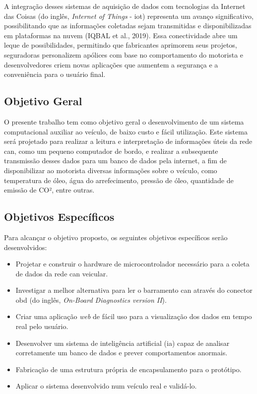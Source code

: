 \documentclass[a4paper, 12pt]{article}
\begin{document}
A integração desses sistemas de aquisição de dados com tecnologias da Internet das Coisas (do inglês, \textit{Internet of Things} - \acrshort{iot}) representa um avanço significativo, possibilitando que as informações coletadas sejam transmitidas e disponibilizadas em plataformas na nuvem (IQBAL et al., 2019). Essa conectividade abre um leque de possibilidades, permitindo que fabricantes aprimorem seus projetos, seguradoras personalizem apólices com base no comportamento do motorista e desenvolvedores criem novas aplicações que aumentem a segurança e a conveniência para o usuário final.

\subsection{Objetivo Geral}

O presente trabalho tem como objetivo geral o desenvolvimento de um sistema computacional auxiliar ao veículo, de baixo custo e fácil utilização. Este sistema será projetado para realizar a leitura e interpretação de informações úteis da rede \acrshort{can}, como um pequeno computador de bordo, e realizar a subsequente transmissão desses dados para um banco de dados pela internet, a fim de disponibilizar ao motorista diversas informações sobre o veículo, como temperatura de óleo, água do arrefecimento, pressão de óleo, quantidade de emissão de CO², entre outras.

\subsection{Objetivos Específicos}

Para alcançar o objetivo proposto, os seguintes objetivos específicos serão desenvolvidos:

\begin{itemize}

\item Projetar e construir o hardware de microcontrolador necessário para a coleta de dados da rede \acrshort{can} veicular.

\item Investigar a melhor alternativa para ler o barramento \acrshort{can} através do conector \acrshort{obd} (do inglês, \textit{On-Board Diagnostics version II}).

\item Criar uma aplicação \textit{web} de fácil uso para a visualização dos dados em tempo real pelo usuário.

\item Desenvolver um sistema de inteligência artificial (\acrshort{ia}) capaz de analisar corretamente um banco de dados e prever comportamentos anormais.

\item Fabricação de uma estrutura própria de encapsulamento para o protótipo.

\item Aplicar o sistema desenvolvido num veículo real e validá-lo.

\end{itemize}
\end{document}

